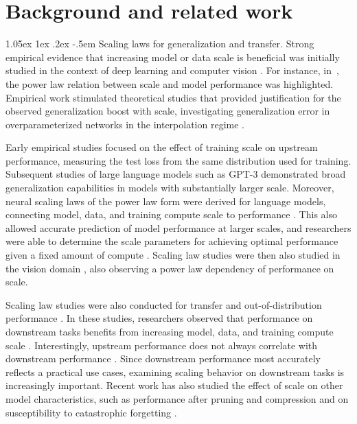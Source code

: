\documentclass[11pt,table]{article}
\makeatletter
\newcommand{\citep}{\cite}
\renewcommand\paragraph{\@startsection{paragraph}{4}{\z@}                                     {1.05ex \@plus1ex \@minus.2ex}                                {-.5em}
{\normalfont\normalsize\bfseries}}
\makeatother
\begin{document}

\section{Background and related work}
\label{sec:background}

\paragraph{Scaling laws for generalization and transfer.} Strong empirical evidence that increasing model or data scale is beneficial was initially studied in the context of deep learning and computer vision \citep{Sun2017,hestness2017deep}. For instance, in~\citep{hestness2017deep}, the power law relation between scale and model performance was highlighted. Empirical work stimulated theoretical studies that provided justification for the observed generalization boost with scale, investigating generalization error in overparameterized networks in the interpolation regime \citep{Belkin2019,Bubeck2021}.

Early empirical studies focused on the effect of training scale on upstream performance, measuring the test loss from the same distribution used for training. 
Subsequent studies of large language models such as GPT-3 \citep{Brown2020} demonstrated broad generalization capabilities in models with substantially larger scale. Moreover, neural scaling laws of the power law form were derived for language models, connecting model, data, and training compute scale to performance \citep{Kaplan2020,tay2021scale,hoffmann2022training}. This also allowed accurate prediction of model performance at larger scales, and researchers were able to determine the scale parameters for achieving optimal performance given a fixed amount of compute \citep{hoffmann2022training,koppula2022should}. Scaling law studies were then also studied in the vision domain \citep{Riquelme2021,Zhai2022scaling}, also observing a power law dependency of performance on scale.   

Scaling law studies were also conducted for transfer and out-of-distribution performance \citep{Kaplan2020,tay2021scale,Zhai2022scaling}. In these studies, researchers observed that performance on downstream tasks benefits from increasing model, data, and training compute scale \citep{Kolesnikov2020, Brown2020, Kaplan2020, Zhai2022scaling}. Interestingly, upstream performance does not always correlate with downstream performance \citep{tay2021scale,tay2022scaling}. Since downstream performance most accurately reflects a practical use cases, examining scaling behavior on downstream tasks is increasingly important. Recent work has also studied the effect of scale on other model characteristics, such as performance after pruning and compression \citep{pmlr-v139-rosenfeld21a, chen2021lottery} and on susceptibility to catastrophic forgetting \citep{ramasesh2021effect}.   
\end{document}
